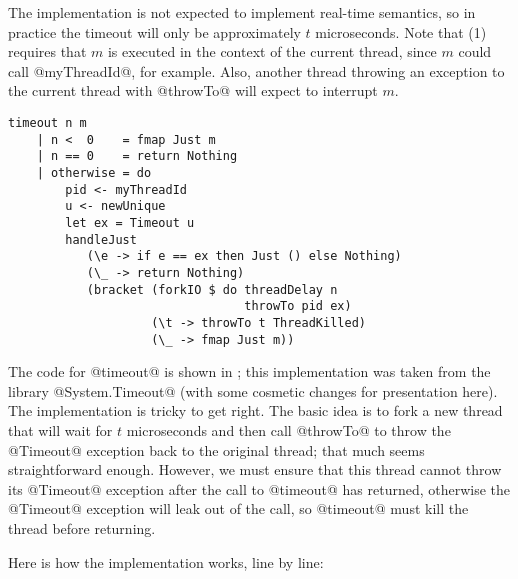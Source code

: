 The implementation is not expected to implement real-time semantics,
so in practice the timeout will only be approximately $t$ microseconds.
Note that (1) requires that $m$ is executed in the context of the
current thread, since $m$ could call @myThreadId@, for example.  Also,
another thread throwing an exception to the current thread with
@throwTo@ will expect to interrupt $m$.

\begin{lstlisting}[float,label=lst:timeout,caption=implementation of \texttt{timeout},language=HaskellUlisses,style=numbers]
timeout n m
    | n <  0    = fmap Just m
    | n == 0    = return Nothing
    | otherwise = do
        pid <- myThreadId
        u <- newUnique
        let ex = Timeout u
        handleJust
           (\e -> if e == ex then Just () else Nothing)
           (\_ -> return Nothing)
           (bracket (forkIO $ do threadDelay n
                                 throwTo pid ex)
                    (\t -> throwTo t ThreadKilled)
                    (\_ -> fmap Just m))
\end{lstlisting}

The code for @timeout@ is shown in ; this
implementation was taken from the library @System.Timeout@ (with some
cosmetic changes for presentation here).  The implementation is tricky
to get right.  The basic idea is to fork a new thread that will wait
for $t$ microseconds and then call @throwTo@ to throw the @Timeout@
exception back to the original thread; that much seems straightforward
enough.  However, we must ensure that this thread cannot throw its
@Timeout@ exception after the call to @timeout@ has returned,
otherwise the @Timeout@ exception will leak out of the call, so
@timeout@ must kill the thread before returning.

Here is how the implementation works, line by line:

